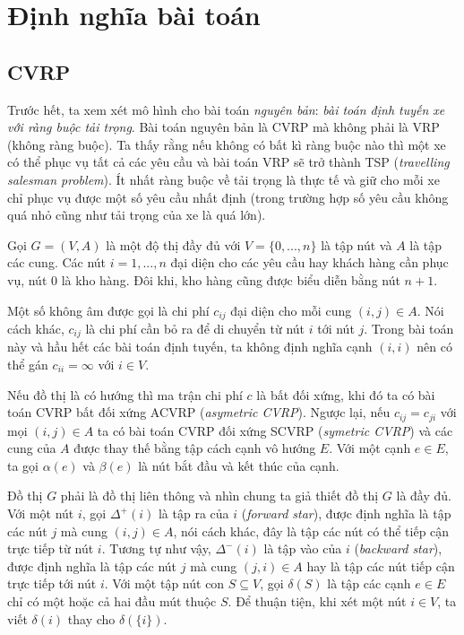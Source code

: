 \section{Định nghĩa bài toán}
\label{sec:def}

\subsection{CVRP}

Trước hết, ta xem xét mô hình cho bài toán \textit{nguyên bản}: \textit{bài toán định tuyến xe với ràng buộc tải trọng}. Bài toán nguyên bản là CVRP mà không phải là VRP (không ràng buộc). Ta thấy rằng nếu không có bất kì ràng buộc nào thì một xe có thể phục vụ tất cả các yêu cầu và bài toán VRP sẽ trở thành TSP (\textit{travelling salesman problem}). Ít nhất ràng buộc về tải trọng là thực tế và giữ cho mỗi xe chỉ phục vụ được một số yêu cầu nhất định (trong trường hợp số yêu cầu không quá nhỏ cũng như tải trọng của xe là quá lớn).


Gọi $G=(V,A)$ là một độ thị đầy đủ với $V=\{ 0, ..., n \}$ là tập nút và $A$ là tập các cung. Các nút $i=1,...,n$ đại diện cho các yêu cầu hay khách hàng cần phục vụ, nút $0$ là kho hàng. Đôi khi, kho hàng cũng được biểu diễn bằng nút $n+1$.

Một số không âm được gọi là chi phí $c_{ij}$ đại diện cho mỗi cung $(i,j) \in A$. Nói cách khác, $c_{ij}$ là chi phí cần bỏ ra để di chuyển từ nút $i$ tới nút $j$. Trong bài toán này và hầu hết các bài toán định tuyến, ta không định nghĩa cạnh $(i,i)$ nên có thể gán $c_{ii} = \infty$ với $i \in V$.

Nếu đồ thị là có hướng thì ma trận chi phí $c$ là bất đối xứng, khi đó ta có bài toán CVRP bất đối xứng ACVRP (\textit{asymetric CVRP}). Ngược lại, nếu $c_{ij} = c_{ji}$ với mọi $(i,j) \in A$ ta có bài toán CVRP đối xứng SCVRP (\textit{symetric CVRP}) và các cung của $A$ được thay thế bằng tập cách cạnh vô hướng $E$. Với một cạnh $e \in E$, ta gọi $\alpha(e)$ và $\beta(e)$ là nút bắt đầu và kết thúc của cạnh.

Đồ thị $G$ phải là đồ thị liên thông và nhìn chung ta giả thiết đồ thị $G$ là đầy đủ. Với một nút $i$, gọi $\Delta^+(i)$ là tập ra của $i$ (\textit{forward star}), được định nghĩa là tập các nút $j$ mà cung $(i,j) \in A$, nói cách khác, đây là tập các nút có thể tiếp cận trực tiếp từ nút $i$. Tương tự như vậy, $\Delta^-(i)$ là tập vào của $i$ (\textit{backward star}), được định nghĩa là tập các nút $j$ mà cung $(j,i) \in A$ hay là tập các nút tiếp cận trực tiếp tới nút $i$. Với một tập nút con $S \subseteq V$, gọi $\delta(S)$ là tập các cạnh $e \in E$ chỉ có một hoặc cả hai đầu mút thuộc $S$. Để thuận tiện, khi xét một nút $i \in V$, ta viết $\delta(i)$ thay cho $\delta(\{i\})$.

